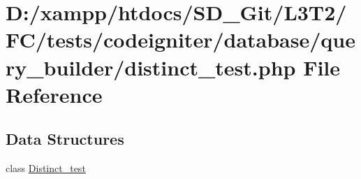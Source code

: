 \hypertarget{distinct__test_8php}{}\section{D\+:/xampp/htdocs/\+S\+D\+\_\+\+Git/\+L3\+T2/\+F\+C/tests/codeigniter/database/query\+\_\+builder/distinct\+\_\+test.php File Reference}
\label{distinct__test_8php}
\subsection*{Data Structures}
\begin{DoxyCompactItemize}
\item 
class \hyperlink{class_distinct__test}{Distinct\+\_\+test}
\end{DoxyCompactItemize}
